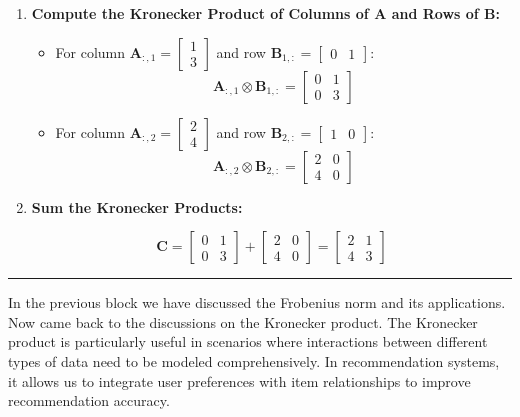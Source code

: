 \documentclass[
  letterpaper,
  DIV=11,
  numbers=noendperiod]{scrreprt}
\theoremstyle{plain}
\theoremstyle{definition}
\theoremstyle{remark}
\begin{document}
\begin{enumerate}
\def\labelenumi{\arabic{enumi}.}
\item
  \textbf{Compute the Kronecker Product of Columns of \(\mathbf{A}\) and
  Rows of \(\mathbf{B}\):}

  \begin{itemize}
  \item
    For column
    \(\mathbf{A}_{:,1} = \begin{bmatrix} 1 \\ 3 \end{bmatrix}\) and row
    \(\mathbf{B}_{1,:} = \begin{bmatrix} 0 & 1 \end{bmatrix}\): \[
    \mathbf{A}_{:,1} \otimes \mathbf{B}_{1,:} = \begin{bmatrix}
    0 & 1 \\
    0 & 3
    \end{bmatrix}
    \]
  \item
    For column
    \(\mathbf{A}_{:,2} = \begin{bmatrix} 2 \\ 4 \end{bmatrix}\) and row
    \(\mathbf{B}_{2,:} = \begin{bmatrix} 1 & 0 \end{bmatrix}\):
    \[\mathbf{A}_{:,2} \otimes \mathbf{B}_{2,:} = \begin{bmatrix}
    2 & 0 \\
    4 & 0
    \end{bmatrix}\]
  \end{itemize}
\item
  \textbf{Sum the Kronecker Products:}

  \[\mathbf{C} = \begin{bmatrix}
  0 & 1 \\
  0 & 3
  \end{bmatrix}
  +
  \begin{bmatrix}
  2 & 0 \\
  4 & 0
  \end{bmatrix}
  =
  \begin{bmatrix}
  2 & 1 \\
  4 & 3
  \end{bmatrix}\]
\end{enumerate}

\begin{center}\rule{0.5\linewidth}{0.5pt}\end{center}

In the previous block we have discussed the Frobenius norm and its
applications. Now came back to the discussions on the Kronecker product.
The Kronecker product is particularly useful in scenarios where
interactions between different types of data need to be modeled
comprehensively. In recommendation systems, it allows us to integrate
user preferences with item relationships to improve recommendation
accuracy.
\end{document}
